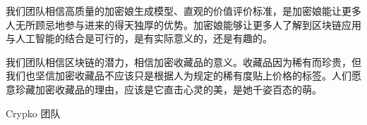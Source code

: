 \documentclass[a4paper]{article}
\begin{document}
我们团队相信高质量的加密娘生成模型、直观的价值评价标准，是加密娘能让更多人无所顾忌地参与进来的得天独厚的优势。加密娘能够让更多人了解到区块链应用与人工智能的结合是可行的，是有实际意义的，还是有趣的。

我们团队相信区块链的潜力，相信加密收藏品的意义。收藏品因为稀有而珍贵，但我们也坚信加密收藏品不应该只是根据人为规定的稀有度贴上价格的标签。人们愿意珍藏加密收藏品的理由，应该是它直击心灵的美，是她千姿百态的萌。

\vspace{5mm}

\begin{flushright}
 Crypko 团队
\end{flushright}

\renewcommand\refname{参考文献}


\end{document}
